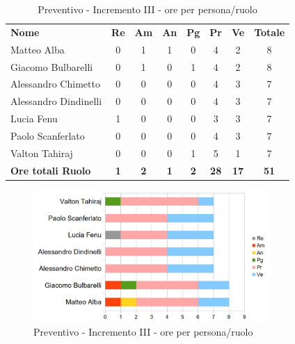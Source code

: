 \begin{table} [h!]
	\begin{center}
		\begin{tabular} { m{3.5cm} c c c c c c c }
			\rowcolor{lightgray}
			\textbf{Nome} & \textbf{Re} & \textbf{Am} & \textbf{An} & \textbf{Pg} & \textbf{Pr} & \textbf{Ve} & \textbf{Totale} \\
			Matteo Alba & 0 & 1 & 1 & 0 & 4 & 2 & 8 \\
			Giacomo Bulbarelli & 0 & 1 & 0 & 1 & 4 & 2 & 8 \\
			Alessandro Chimetto & 0 & 0 & 0 & 0 & 4 & 3 & 7 \\
			Alessandro Dindinelli & 0 & 0 & 0 & 0 & 4 & 3 & 7 \\
			Lucia Fenu & 1 & 0 & 0 & 0 & 3 & 3 & 7 \\
			Paolo Scanferlato & 0 & 0 & 0 & 0 & 4 & 3 & 7 \\
			Valton Tahiraj & 0 & 0 & 0 & 1 & 5 & 1 & 7 \\
			\textbf{Ore totali Ruolo} & \textbf{1} & \textbf{2} & \textbf{1} & \textbf{2} & \textbf{28}& \textbf{17} & \textbf{51}
		\end{tabular}
		\caption{Preventivo - Incremento III - ore per persona/ruolo}
	\end{center}
\end{table}
\begin{figure} [h!]
	\centering
	\includegraphics[width=0.8\textwidth]{res/img/grafici/Incremento3Ore.jpg}
	\caption{Preventivo - Incremento III - ore per persona/ruolo} 
\end{figure}

\newpage

